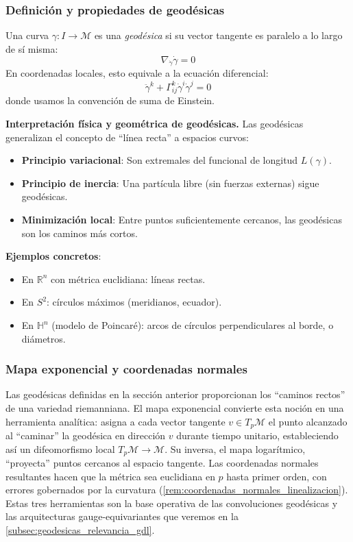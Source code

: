 \subsubsection{Definición y propiedades de geodésicas}\label{subsec:geodesicas_definicion}

\begin{definition}[Geodésica]\label{def:geodesica}
Una curva $\gamma: I \to \mathcal{M}$ es una \textit{geodésica} si su vector tangente es paralelo a lo largo de sí misma:
\[
\nabla_{\dot{\gamma}} \dot{\gamma} = 0
\]
En coordenadas locales, esto equivale a la ecuación diferencial:
\[
\ddot{\gamma}^k + \Gamma^k_{ij} \dot{\gamma}^i \dot{\gamma}^j = 0
\]
donde usamos la convención de suma de Einstein.
\end{definition}

\textbf{Interpretación física y geométrica de geodésicas.}\label{rem:interpretacion_geodesicas} Las geodésicas generalizan el concepto de ``línea recta'' a espacios curvos:
\begin{itemize}
	\item \textbf{Principio variacional}: Son extremales del funcional de longitud $L(\gamma)$.
	\item \textbf{Principio de inercia}: Una partícula libre (sin fuerzas externas) sigue geodésicas.
	\item \textbf{Minimización local}: Entre puntos suficientemente cercanos, las geodésicas son los caminos más cortos.
\end{itemize}

\textbf{Ejemplos concretos}:
\begin{itemize}
	\item En $\mathbb{R}^n$ con métrica euclidiana: líneas rectas.
	\item En $S^2$: círculos máximos (meridianos, ecuador).
	\item En $\mathbb{H}^n$ (modelo de Poincaré): arcos de círculos perpendiculares al borde, o diámetros.
\end{itemize}

\subsubsection{Mapa exponencial y coordenadas normales}\label{subsec:mapa_exponencial}

Las geodésicas definidas en la sección anterior proporcionan los ``caminos rectos'' de una variedad riemanniana. El mapa exponencial convierte esta noción en una herramienta analítica: asigna a cada vector tangente $v \in T_p\mathcal{M}$ el punto alcanzado al ``caminar'' la geodésica en dirección $v$ durante tiempo unitario, estableciendo así un difeomorfismo local $T_p\mathcal{M} \to \mathcal{M}$. Su inversa, el mapa logarítmico, ``proyecta'' puntos cercanos al espacio tangente. Las coordenadas normales resultantes hacen que la métrica sea euclidiana en $p$ hasta primer orden, con errores gobernados por la curvatura (\autoref{rem:coordenadas_normales_linealizacion}). Estas tres herramientas son la base operativa de las convoluciones geodésicas y las arquitecturas gauge-equivariantes que veremos en la \autoref{subsec:geodesicas_relevancia_gdl}.

